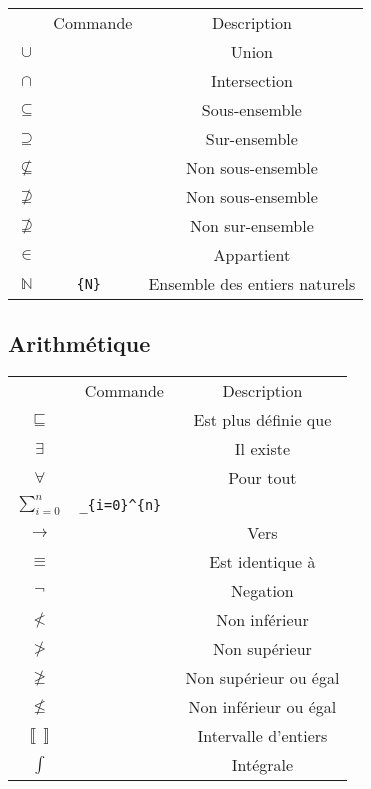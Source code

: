 \documentclass[11pt,a4paper]{article}
\def\X#1{$#1$ &\tt\string#1} %
\begin{document}
	\begin{center}
		\begin{tabu}{|c|c|c|}
			\everyrow{\hline}
			\hline
			 & Commande & Description\\
			\X\cup & Union\\
			\X\cap & Intersection\\
			\X\subseteq & Sous-ensemble\\
			\X\supseteq & Sur-ensemble\\
			\X\nsubseteq & Non sous-ensemble\\
			\X\nsupseteq & Non sous-ensemble\\
			\X\nsupseteq & Non sur-ensemble\\
			\X\in & Appartient\\
			$\mathbb{N}$ & \tt\string\mathbb\{N\} & Ensemble des entiers naturels\\
		\end{tabu}
	\end{center}
	
	\subsection{Arithmétique}
	
	\begin{center}
		\begin{tabu}{|c|c|c|}
			\everyrow{\hline}
			\hline
			 & Commande & Description\\
			\X\sqsubseteq & Est plus définie que\\
			\X\exists & Il existe\\
			\X\forall & Pour tout\\
			$\sum_{i=0}^{n}$ & \tt\string\sum\_\{i=0\}\string^\{n\} &\\
			\X\to & Vers\\
			\X\equiv & Est identique à\\
			\X\neg & Negation\\
			\X\nless  & Non inférieur\\
			\X\ngtr & Non supérieur\\
			\X\ngeqslant & Non supérieur ou égal\\
			\X\nleqslant & Non inférieur ou égal\\
			$\llbracket \ \ \rrbracket$ & \tt\string\llbracket \tt\string\rrbracket & Intervalle d'entiers\\
			\X\int & Intégrale\\
		\end{tabu}
	\end{center}
\end{document}
